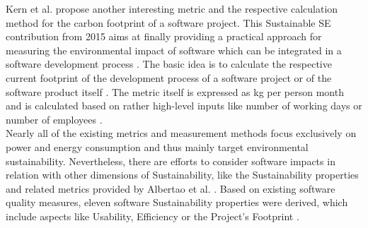 \documentclass[oribibl]{llncs}
\begin{document}
Kern et al. \cite{kern_impacts_2015} propose another interesting metric and the respective calculation method for the carbon footprint of a software project. This Sustainable SE contribution from 2015 aims at finally providing a practical approach for measuring the environmental impact of software which can be integrated in a software development process \cite{kern_impacts_2015}. The basic idea is to calculate the respective current footprint of the development process of a software project or of the software product itself \cite{kern_impacts_2015}. The metric itself is expressed as kg  per person month and is calculated based on rather high-level inputs like number of working days or number of employees \cite{kern_impacts_2015}.\\
Nearly all of the existing metrics and measurement methods focus exclusively on power and energy consumption and thus mainly target environmental sustainability. %
Nevertheless, there are efforts to consider software impacts in relation with other dimensions of Sustainability, like the Sustainability properties and related metrics provided by Albertao et al. \cite{albertao_measuring_2010}. 
Based on existing software quality measures, eleven software Sustainability properties were derived, which include aspects like Usability, Efficiency or the Project's Footprint \cite{albertao_measuring_2010}. 


\end{document}
